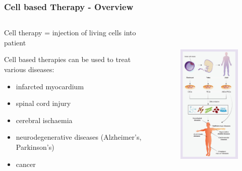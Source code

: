 \documentclass[8pt,xcolor=table]{beamer}
\begin{document}
\begin{frame}
\frametitle{Cell based Therapy - Overview}

\vspace{-1em}

\begin{columns}

\begin{column}{0.5\textwidth}

Cell therapy = injection of living cells into patient
 
 \vspace{3em}
 
Cell based therapies can be used to treat various diseases:
\begin{itemize}
 \item infarcted myocardium
 \item spinal cord injury
 \item cerebral ischaemia
 \item neurodegenerative diseases (Alzheimer's, Parkinson's)
 \item cancer
\end{itemize} 
 
 
\end{column}

\begin{column}{0.5\textwidth}
 \begin{figure}
 \centering
  \includegraphics[height=8cm]{cell_therapy_overview}
 \end{figure}

\end{column}
\end{columns}

\end{frame}
\end{document}
